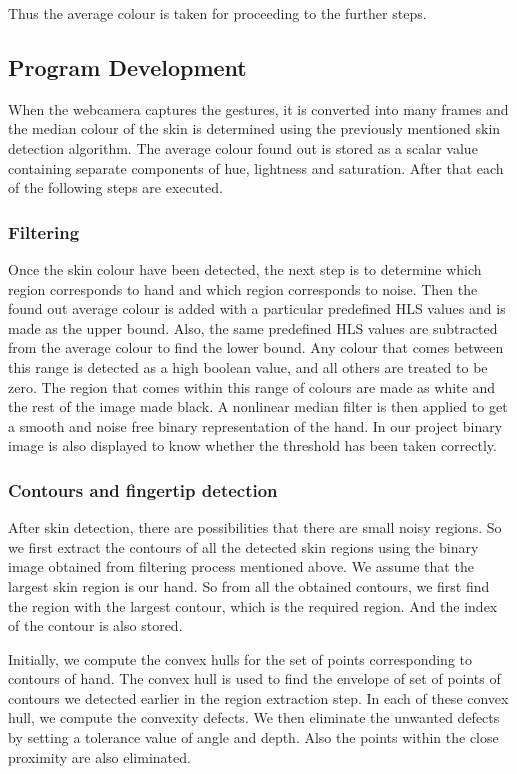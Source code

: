\documentclass[a4paper,11pt]{article}
\begin{document}
				Thus the average colour is taken for proceeding to the further steps.


		\subsection{Program Development}
			When the webcamera captures the gestures, it is converted into many frames and the median colour of the skin is determined using the previously mentioned skin detection algorithm. The average colour found out is stored as a scalar value containing separate components of hue, lightness and saturation. After that each of the following steps are executed.
		\subsubsection{Filtering}
			Once the skin colour have been detected, the next step is to determine which region corresponds to hand and which region corresponds to noise. Then the found out average colour is added with a particular predefined HLS values and is made as the upper bound. Also, the same predefined HLS values are subtracted from the average colour to find the lower bound. Any colour that comes between this range is detected as a high boolean value, and all others are treated to be zero. The region that comes within this range of colours are made as white and the rest of the image made black.  A nonlinear median filter is then applied to get a smooth and noise free binary representation of the hand. In our project binary image is also displayed to know whether the threshold has been taken correctly.

			\subsubsection{Contours and fingertip detection}
				After skin detection, there are possibilities that there are small noisy regions. So we first extract the contours of all the detected skin regions using the binary image obtained from filtering process mentioned above. We assume that the largest skin region is our hand. So from all the obtained contours, we first find the region with the largest contour, which is the required region. And the index of the contour is also stored. 

				Initially, we compute the convex hulls for the set of points corresponding to contours of hand. The convex hull is used to find the envelope of set of points of contours we detected earlier in the region extraction step. In each of these convex hull, we compute the convexity defects. We then eliminate the unwanted defects by setting a tolerance value of angle and depth. Also the points within the close proximity are also eliminated.
\end{document}
